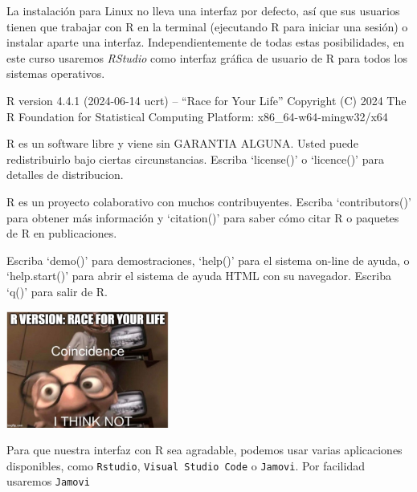 \documentclass[
  letterpaper,
  DIV=11,
  numbers=noendperiod]{scrreprt}
\begin{document}
La instalación para Linux no lleva una interfaz por defecto, así que sus
usuarios tienen que trabajar con R en la terminal (ejecutando R para
iniciar una sesión) o instalar aparte una interfaz. Independientemente
de todas estas posibilidades, en este curso usaremos \emph{RStudio} como
interfaz gráfica de usuario de R para todos los sistemas operativos.

\begin{tcolorbox}[enhanced jigsaw, colframe=quarto-callout-note-color-frame, coltitle=black, colback=white, toptitle=1mm, bottomrule=.15mm, bottomtitle=1mm, leftrule=.75mm, opacityback=0, rightrule=.15mm, titlerule=0mm, title=\textcolor{quarto-callout-note-color}{\faInfo}\hspace{0.5em}{Nota}, arc=.35mm, toprule=.15mm, left=2mm, opacitybacktitle=0.6, breakable, colbacktitle=quarto-callout-note-color!10!white]

R version 4.4.1 (2024-06-14 ucrt) -- ``Race for Your Life'' Copyright
(C) 2024 The R Foundation for Statistical Computing Platform:
x86\_64-w64-mingw32/x64

R es un software libre y viene sin GARANTIA ALGUNA. Usted puede
redistribuirlo bajo ciertas circunstancias. Escriba `license()' o
`licence()' para detalles de distribucion.

R es un proyecto colaborativo con muchos contribuyentes. Escriba
`contributors()' para obtener más información y `citation()' para saber
cómo citar R o paquetes de R en publicaciones.

Escriba `demo()' para demostraciones, `help()' para el sistema on-line
de ayuda, o `help.start()' para abrir el sistema de ayuda HTML con su
navegador. Escriba `q()' para salir de R.

\end{tcolorbox}

\begin{center}
\includegraphics[width=0.4\textwidth,height=\textheight]{Figuras/MM1.jpg}
\end{center}

Para que nuestra interfaz con R sea agradable, podemos usar varias
aplicaciones disponibles, como \texttt{Rstudio},
\texttt{Visual\ Studio\ Code} o \texttt{Jamovi}. Por facilidad usaremos
\texttt{Jamovi}
\end{document}
